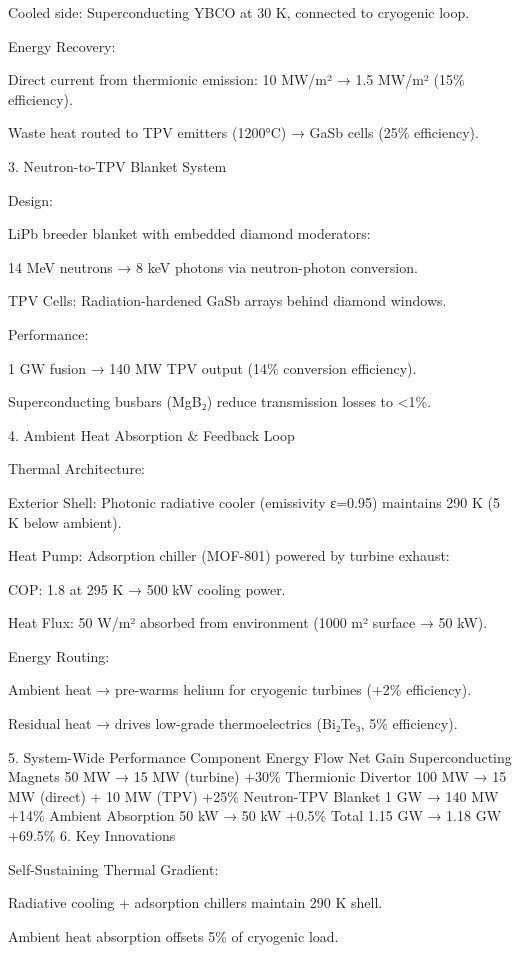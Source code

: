 \documentclass{article}
\begin{document}
Cooled side: Superconducting YBCO at 30 K, connected to cryogenic loop.

Energy Recovery:

Direct current from thermionic emission: 10 MW/m² → 1.5 MW/m² (15\%
efficiency).

Waste heat routed to TPV emitters (1200°C) → GaSb cells (25\%
efficiency).

3. Neutron-to-TPV Blanket System

Design:

LiPb breeder blanket with embedded diamond moderators:

14 MeV neutrons → 8 keV photons via neutron-photon conversion.

TPV Cells: Radiation-hardened GaSb arrays behind diamond windows.

Performance:

1 GW fusion → 140 MW TPV output (14\% conversion efficiency).

Superconducting busbars (MgB₂) reduce transmission losses to
\textless1\%.

4. Ambient Heat Absorption \& Feedback Loop

Thermal Architecture:

Exterior Shell: Photonic radiative cooler (emissivity ε=0.95) maintains
290 K (5 K below ambient).

Heat Pump: Adsorption chiller (MOF-801) powered by turbine exhaust:

COP: 1.8 at 295 K → 500 kW cooling power.

Heat Flux: 50 W/m² absorbed from environment (1000 m² surface → 50 kW).

Energy Routing:

Ambient heat → pre-warms helium for cryogenic turbines (+2\%
efficiency).

Residual heat → drives low-grade thermoelectrics (Bi₂Te₃, 5\%
efficiency).

5. System-Wide Performance Component Energy Flow Net Gain
Superconducting Magnets 50 MW → 15 MW (turbine) +30\% Thermionic
Divertor 100 MW → 15 MW (direct) + 10 MW (TPV) +25\% Neutron-TPV Blanket
1 GW → 140 MW +14\% Ambient Absorption 50 kW → 50 kW +0.5\% Total 1.15
GW → 1.18 GW +69.5\% 6. Key Innovations

Self-Sustaining Thermal Gradient:

Radiative cooling + adsorption chillers maintain 290 K shell.

Ambient heat absorption offsets 5\% of cryogenic load.
\end{document}
